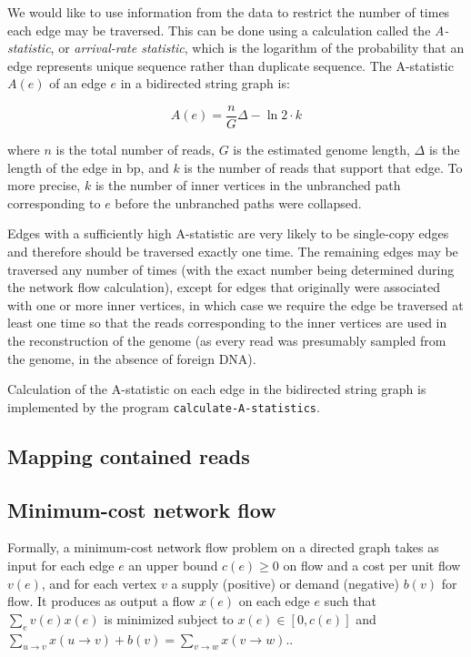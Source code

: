 \documentclass[10pt]{article}
\newcommand{\KeyTerm}[1]{{\it #1}}
\begin{document}
We would like to use information from the data to restrict the number of times
each edge may be traversed.  This can be done using a calculation called the
\KeyTerm{A-statistic}, or \KeyTerm{arrival-rate statistic}, which is the
logarithm of the probability that an edge represents unique sequence rather than
duplicate sequence.  The A-statistic $A(e)$ of an edge $e$ in a bidirected
string graph is:

\[ A(e) = \frac{n}{G} \Delta - \ln{2} \cdot {k} \]

where $n$ is the total number of reads, $G$ is the estimated genome length,
$\Delta$ is the length of the edge in bp, and $k$ is the number of reads that
support that edge.  To more precise, $k$ is the number of inner vertices in the
unbranched path corresponding to $e$ before the unbranched paths were collapsed.

Edges with a sufficiently high A-statistic are very likely to be single-copy
edges and therefore should be traversed exactly one time.  The remaining edges
may be traversed any number of times (with the exact number being determined
during the network flow calculation), except for edges that originally were
associated with one or more inner vertices, in which case we require the edge be
traversed at least one time so that the reads corresponding to the inner
vertices are used in the reconstruction of the genome (as every read was
presumably sampled from the genome, in the absence of foreign DNA).

Calculation of the A-statistic on each edge in the bidirected string graph is
implemented by the program {\tt calculate-A-statistics}.

\subsection{Mapping contained reads}

\subsection{Minimum-cost network flow}

Formally, a minimum-cost network flow problem on a directed graph takes as input
for each edge $e$ an upper bound $c(e) \ge 0$ on flow and a cost per unit flow
$v(e)$, and for each vertex $v$ a supply (positive) or demand (negative)
$b(v)$ for flow.  It produces as output a flow $x(e)$ on each edge $e$ such
that $\sum_e v(e)x(e)$ is minimized subject to $x(e) \in [0, c(e)]$ and
$\sum_{u \to v}x(u \to v) + b(v) = \sum_{v \to w} x(v \to w)$.\cite{Myers2005}.
\end{document}
